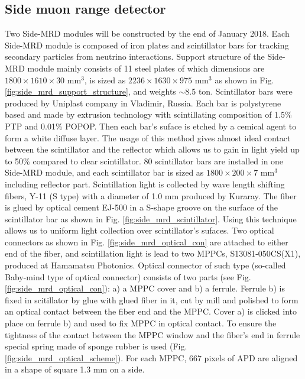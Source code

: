 \subsection{Side muon range detector}
Two Side-MRD modules will be constructed by the end of January 2018. 
Each Side-MRD module is composed of iron plates and scintillator bars for tracking secondary particles from neutrino interactions.
Support structure of the Side-MRD module mainly consists of 11 steel plates of which dimensions are $1800\times1610\times30$ mm$^{3}$, is sized as $2236\times1630\times975$ mm$^{3}$ as shown in Fig. \ref{fig:side_mrd_support_structure}, and weights $\sim$8.5 ton. 
Scintillator bars were produced by Uniplast company in Vladimir, Russia. Each bar is polystyrene based and made by extrusion technology with scintillating composition of 1.5\% PTP and 0.01\% POPOP. Then each bar's suface is etched by a cemical agent to form a white diffuse layer. The usage of this method gives almost ideal contact between the scintillator and the reflector which allows us to gain in light yield up to 50\% compared to clear scintillator. 80 scintillator bars are installed in one Side-MRD module, and each scintillator bar is sized as $1800\times200\times7$ mm$^{3}$ including reflector part. 
Scintillation light is collected by wave length shifting fibers, Y-11 (S type) with a diameter of 1.0 mm produced by Kuraray. 
The fiber is glued by optical cement EJ-500 in a S-shape groove on the surface of the scintillator bar as shown in Fig. \ref{fig:side_mrd_scintillator}. Using this technique allows us to uniform light collection over scintillator's sufaces.
Two optical connectors as shown in Fig. \ref{fig:side_mrd_optical_con} are attached to either end of the fiber, and scintillation light is lead to two MPPCs, S13081-050CS(X1), produced at Hamamatsu Photonics. Optical connector of such type (so-called Baby-mind type of optical connector) consists of two parts (see Fig. \ref{fig:side_mrd_optical_con}): a) a MPPC cover and b) a ferrule. Ferrule b) is fixed in scitillator by glue with glued fiber in it, cut by mill and polished to form an optical contact between the fiber end and the MPPC. Cover a) is clicked into place on ferrule b) and used to fix MPPC in optical contact. To ensure the tightness of the contact between the MPPC window and the fiber's end in ferrule special spring made of sponge rubber is used (Fig. \ref{fig:side_mrd_optical_scheme}). 
For each MPPC, 667 pixels of APD are aligned in a shape of square 1.3 mm on a side. 

